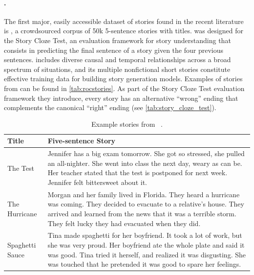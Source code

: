 \paragraph{\roc.}
The first major, easily accessible dataset of stories found in the recent literature is {\roc} \citep{mostafazadeh2016corpus}, a crowdsourced corpus of 50k 5-sentence stories with titles. {\roc} was designed for the Story Cloze Test, an evaluation framework for story understanding that consists in predicting the final sentence of a story given the four previous sentences. {\roc} includes diverse causal and temporal relationships across a broad spectrum of situations, and its multiple nonfictional short stories constitute effective training data for building story generation models. Examples of stories from {\roc} can be found in \autoref{tab:rocstories}. As part of the Story Cloze Test evaluation framework they introduce, every story has an alternative ``wrong'' ending that complements the canonical ``right'' ending (see \autoref{tab:story_cloze_test}).

\begin{table}[h!]
\small
\centering
\begin{tabular}{lp{}}
\toprule
    \textbf{Title} & \textbf{Five-sentence Story} \\
\midrule
    The Test & Jennifer has a big exam tomorrow. She got so stressed, she pulled an all-nighter. She went into class the next day, weary as can be. Her teacher stated that the test is postponed for next week. Jennifer felt bittersweet about it. \\
\midrule
    The Hurricane & Morgan and her family lived in Florida. They heard a hurricane was coming. They decided to evacuate to a relative's house. They arrived and learned from the news that it was a terrible storm. They felt lucky they had evacuated when they did. \\
\midrule
    Spaghetti Sauce & Tina made spaghetti for her boyfriend. It took a lot of work, but she was very proud. Her boyfriend ate the whole plate and said it was good. Tina tried it herself, and realized it was disgusting. She was touched that he pretended it was good to spare her feelings. \\
\bottomrule
\end{tabular}
\caption{Example stories from \roc\ \citep{mostafazadeh2016corpus}.}
\label{tab:rocstories}
\end{table}

